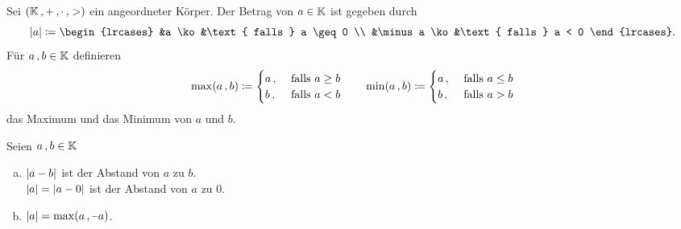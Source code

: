 \documentclass[../ana1.tex]{subfiles}
\begin{document}
\begin{defi}[Betrag]
	Sei \((\mathbb{K} \operatorname{,} + \operatorname{,} \cdot \operatorname{,} >) \) ein angeordneter Körper. Der Betrag von 
	\(a \in \mathbb{K} \) ist gegeben durch
	\[\abs{a} \coloneqq
		\begin{lrcases}
			&a \ko  &\text{ falls } a \geq 0  \\
			&\minus a \ko &\text{ falls } a < 0
		\end{lrcases}. \]
	Für \(a \operatorname{,} b \in \mathbb{K} \) definieren
	\[\max(a \operatorname{,} b) \coloneqq
		\begin{cases}
			a \operatorname{,} &\text{ falls } a \geq b  \\
			b \operatorname{,} &\text{ falls } a < b
		\end{cases}
		\qquad
	  \min(a \operatorname{,} b) \coloneqq
		\begin{cases}
			a \operatorname{,} &\text{ falls } a \leq b  \\
			b \operatorname{,} &\text{ falls } a > b
		\end{cases} \]
	das Maximum und das Minimum von \(a \) und \(b \).
\end{defi}

\begin{bem}\label{bem:abstand}
	Seien \(a \operatorname{,} b \in \mathbb{K} \)
	\begin{enumerate}[(a)]
		\item \(\left|a - b\right| \) ist der Abstand von \(a \) zu \(b \). \\
		      \(\left|a\right| = \left|a - 0\right| \) ist der Abstand von \(a \) zu \(0 \).
		\item \(\abs{a} = \max(a \ko \minus a) \).
	\end{enumerate}
\end{bem}

\iftoggle{short}{}{\newpage}%
\end{document}
